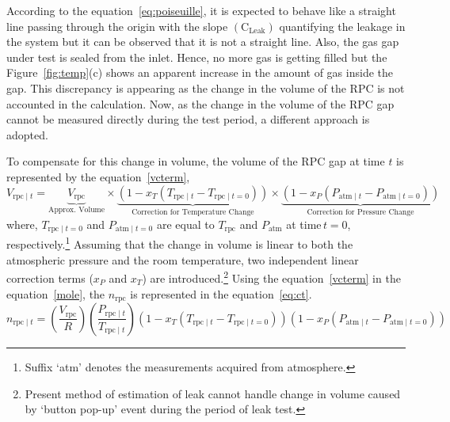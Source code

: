 According to the equation~\ref{eq:poiseuille}, it is expected to behave like a straight line passing through the origin with the slope $\left(\textrm{C}_{\textrm{Leak}}\right)$ quantifying the leakage in the system but it can be observed that it is not a straight line. Also, the gas gap under test is sealed from the inlet. Hence, no more gas is getting filled but the Figure~\ref{fig:temp}(c) shows an apparent increase in the amount of gas inside the gap. This discrepancy is appearing as the change in the volume of the RPC is not accounted in the calculation. Now, as the change in the volume of the RPC gap cannot be measured directly during the test period, a different approach is adopted.

To compensate for this change in volume, the volume of the RPC gap at time $t$ is represented by the equation~\ref{vcterm},
\begin{equation}
  V_{\textrm{rpc}\mid t} = \underbrace{V_{\textrm{rpc}}}_{\text{Approx. Volume}}\times\underbrace{\left(1-x_T\left(T_{\textrm{rpc}\mid t}-T_{\textrm{rpc}\mid t=0}\right)\right)}_{\text{Correction for Temperature Change}}\times\underbrace{\left(1-x_P\left(P_{\textrm{atm}\mid t}-P_{\textrm{atm}\mid t=0}\right)\right)}_{\text{Correction for Pressure Change}}\label{vcterm}
\end{equation}
where, $T_{\textrm{rpc}\mid t=0}$ and $P_{\textrm{atm}\mid t=0}$ are equal to $T_{\textrm{rpc}}$ and $P_{\textrm{atm}}$ at time\,$t=0$, respectively.\footnote{Suffix `atm' denotes the measurements acquired from atmosphere.} Assuming that the change in volume is linear to both the atmospheric pressure and the room temperature, two independent linear correction terms ($x_P$ and $x_T$) are introduced.\footnote{Present method of estimation of leak cannot handle change in volume caused by `button pop-up' event during the period of leak test.} Using the equation~\ref{vcterm} in the equation~\ref{mole}, the $n_{\textrm{rpc}}$ is represented in the equation~\ref{eq:ct}.
\begin{equation}
  n_{\textrm{rpc}\mid t}=\left(\frac{V_{\textrm{rpc}}}{R}\right)\left(\frac{P_{\textrm{rpc}\mid t}}{T_{\textrm{rpc}\mid t}}\right)\left(1-x_T\left(T_{\textrm{rpc}\mid t}-T_{\textrm{rpc}\mid t=0}\right)\right)\left(1-x_P\left(P_{\textrm{atm}\mid t}-P_{\textrm{atm}\mid t=0}\right)\right) \label{eq:ct}
\end{equation}

